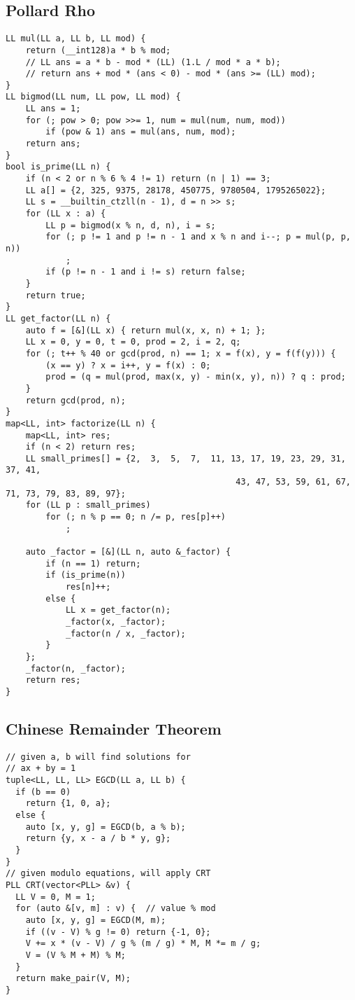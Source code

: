 \documentclass[FSZ,a4paper,onesided]{article}
\begin{document}
\begin{multicols*}{\COLS}
\subsection{Pollard Rho}
\begin{lstlisting}
LL mul(LL a, LL b, LL mod) {
    return (__int128)a * b % mod;
    // LL ans = a * b - mod * (LL) (1.L / mod * a * b);
    // return ans + mod * (ans < 0) - mod * (ans >= (LL) mod);
}
LL bigmod(LL num, LL pow, LL mod) {
    LL ans = 1;
    for (; pow > 0; pow >>= 1, num = mul(num, num, mod))
        if (pow & 1) ans = mul(ans, num, mod);
    return ans;
}
bool is_prime(LL n) {
    if (n < 2 or n % 6 % 4 != 1) return (n | 1) == 3;
    LL a[] = {2, 325, 9375, 28178, 450775, 9780504, 1795265022};
    LL s = __builtin_ctzll(n - 1), d = n >> s;
    for (LL x : a) {
        LL p = bigmod(x % n, d, n), i = s;
        for (; p != 1 and p != n - 1 and x % n and i--; p = mul(p, p, n))
            ;
        if (p != n - 1 and i != s) return false;
    }
    return true;
}
LL get_factor(LL n) {
    auto f = [&](LL x) { return mul(x, x, n) + 1; };
    LL x = 0, y = 0, t = 0, prod = 2, i = 2, q;
    for (; t++ % 40 or gcd(prod, n) == 1; x = f(x), y = f(f(y))) {
        (x == y) ? x = i++, y = f(x) : 0;
        prod = (q = mul(prod, max(x, y) - min(x, y), n)) ? q : prod;
    }
    return gcd(prod, n);
}
map<LL, int> factorize(LL n) {
    map<LL, int> res;
    if (n < 2) return res;
    LL small_primes[] = {2,  3,  5,  7,  11, 13, 17, 19, 23, 29, 31, 37, 41,
                                              43, 47, 53, 59, 61, 67, 71, 73, 79, 83, 89, 97};
    for (LL p : small_primes)
        for (; n % p == 0; n /= p, res[p]++)
            ;

    auto _factor = [&](LL n, auto &_factor) {
        if (n == 1) return;
        if (is_prime(n))
            res[n]++;
        else {
            LL x = get_factor(n);
            _factor(x, _factor);
            _factor(n / x, _factor);
        }
    };
    _factor(n, _factor);
    return res;
}
\end{lstlisting}
\subsection{Chinese Remainder Theorem}
\begin{lstlisting}
// given a, b will find solutions for
// ax + by = 1
tuple<LL, LL, LL> EGCD(LL a, LL b) {
  if (b == 0)
    return {1, 0, a};
  else {
    auto [x, y, g] = EGCD(b, a % b);
    return {y, x - a / b * y, g};
  }
}
// given modulo equations, will apply CRT
PLL CRT(vector<PLL> &v) {
  LL V = 0, M = 1;
  for (auto &[v, m] : v) {  // value % mod
    auto [x, y, g] = EGCD(M, m);
    if ((v - V) % g != 0) return {-1, 0};
    V += x * (v - V) / g % (m / g) * M, M *= m / g;
    V = (V % M + M) % M;
  }
  return make_pair(V, M);
}
\end{lstlisting}

\end{multicols*}
\end{document}
